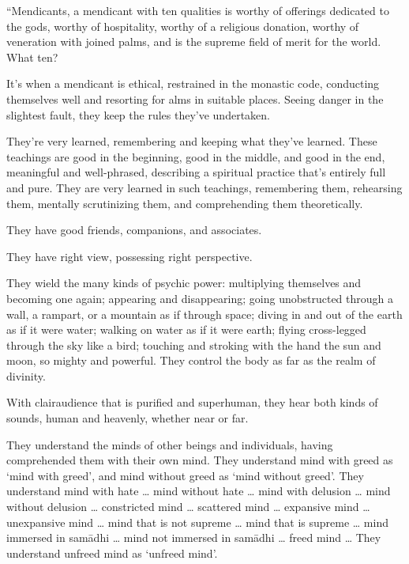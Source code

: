\documentclass[12pt,openany]{book}%
\begin{document}
“Mendicants, a mendicant with ten qualities is worthy of offerings dedicated to the gods, worthy of hospitality, worthy of a religious donation, worthy of veneration with joined palms, and is the supreme field of merit for the world. What ten? 

It’s when a mendicant is ethical, restrained in the monastic code, conducting themselves well and resorting for alms in suitable places. Seeing danger in the slightest fault, they keep the rules they’ve undertaken. 

They’re very learned, remembering and keeping what they’ve learned. These teachings are good in the beginning, good in the middle, and good in the end, meaningful and well-phrased, describing a spiritual practice that’s entirely full and pure. They are very learned in such teachings, remembering them, rehearsing them, mentally scrutinizing them, and comprehending them theoretically. 

They have good friends, companions, and associates. 

They have right view, possessing right perspective. 

They wield the many kinds of psychic power: multiplying themselves and becoming one again; appearing and disappearing; going unobstructed through a wall, a rampart, or a mountain as if through space; diving in and out of the earth as if it were water; walking on water as if it were earth; flying cross-legged through the sky like a bird; touching and stroking with the hand the sun and moon, so mighty and powerful. They control the body as far as the realm of divinity. 

With clairaudience that is purified and superhuman, they hear both kinds of sounds, human and heavenly, whether near or far. 

They understand the minds of other beings and individuals, having comprehended them with their own mind. They understand mind with greed as ‘mind with greed’, and mind without greed as ‘mind without greed’. They understand mind with hate … mind without hate … mind with delusion … mind without delusion … constricted mind … scattered mind … expansive mind … unexpansive mind … mind that is not supreme … mind that is supreme … mind immersed in \textsanskrit{samādhi} … mind not immersed in \textsanskrit{samādhi} … freed mind … They understand unfreed mind as ‘unfreed mind’. 
\end{document}
